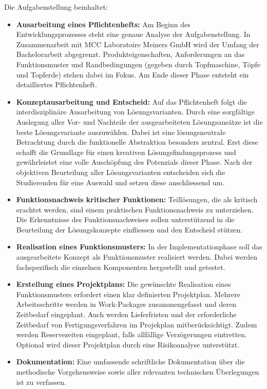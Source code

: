 Die Aufgabenstellung beinhaltet:
\begin{itemize}
	\item \textbf{Ausarbeitung eines Pflichtenhefts:} Am Beginn des Entwicklungsprozesses steht eine genaue Analyse der Aufgabenstellung. In Zusammenarbeit mit MCC Laboratoire Meiners GmbH wird der Umfang der Bachelorarbeit abgegrenzt. Produkteigenschaften, Anforderungen an das Funktionsmuster und Randbedingungen (gegeben durch Topfmaschine, Töpfe und Topferde) stehen dabei im Fokus. Am Ende dieser Phase entsteht ein detailliertes Pflichtenheft.
	 
	\item \textbf{Konzeptausarbeitung und Entscheid:} Auf das Pflichtenheft folgt die interdisziplinäre Ausarbeitung von Lösungsvarianten. Durch eine sorgfältige Auslegung aller Vor- und Nachteile der ausgearbeiteten Lösungsansätze ist die beste Lösungsvariante auszuwählen. Dabei ist eine lösungsneutrale Betrachtung durch die funktionelle Abstraktion besonders zentral. Erst diese schafft die Grundlage für einen kreativen Lösungsfindungsprozess und gewährleistet eine volle Auschöpfung des Potenzials dieser Phase. Nach der objektiven Beurteilung aller Lösungsvarianten entscheiden sich die Studierenden für eine Auswahl und setzen diese anschliessend um.
	
	\item \textbf{Funktionsnachweis kritischer Funktionen:} Teillösungen, die als kritisch erachtet werden, sind einem praktischen Funktionsnachweis zu unterziehen. Die Erkenntnisse des Funktionsnachweises sollen unterstützend in die Beurteilung der Lösungskonzepte einfliessen und den Entscheid stützen.
	
	\item \textbf{Realisation eines Funktionsmusters:} In der Implementationphase soll das ausgearbeitete Konzept als Funktionsmuster realisiert werden. Dabei werden fachspezifisch die einzelnen Komponenten hergestellt und getestet. 
	
	\item \textbf{Erstellung eines Projektplans:} Die gewünschte Realisation eines Funktionsmusters erfordert einen klar definierten Projektplan. Mehrere Arbeitsschritte werden in Work-Packages zusammengefasst und deren Zeitbedarf eingeplant. Auch  werden Lieferfristen und der erforderliche Zeitbedarf von Fertigungsverfahren im Projekplan mitberücksichtigt. Zudem werden Reservezeiten eingeplant, falls allfällige Verzögerungen eintretten. Optional wird dieser Projektplan durch eine Risikoanalyse unterstützt.
	
	\item \textbf{Dokumentation:} Eine umfassende schriftliche Dokumentation über die methodische Vorgehensweise sowie aller relevanten technischen Überlegungen ist zu verfassen. 
	
\end{itemize}